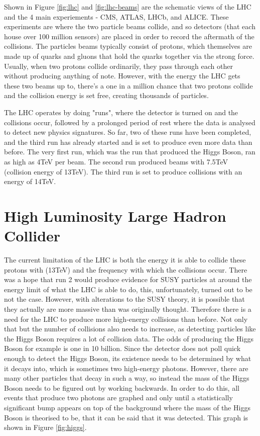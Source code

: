 \documentclass[a4paper]{article}
\theoremstyle{plain}
\theoremstyle{definition}
\begin{document}
	Shown in Figure \ref{fig:lhc} and \ref{fig:lhc-beams} are the schematic views of the LHC and the 4 main experiements - CMS, ATLAS, LHCb, and ALICE. These experiments are where the two particle beams collide, and so detectors (that each house over 100 million sensors) are placed in order to record the aftermath of the collisions. The particles beams typically consist of protons, which themselves are made up of quarks and gluons that hold the quarks together via the strong force. Usually, when two protons collide ordinarily, they pass through each other without producing anything of note. However, with the energy the LHC gets these two beams up to, there's a one in a million chance that two protons collide and the collision energy is set free, creating thousands of particles. 

	The LHC operates by doing "runs", where the detector is turned on and the collisions occur, followed by a prolonged period of rest where the data is analysed to detect new physics signatures. So far, two of these runs have been completed, and the third run has already started and is set to produce even more data than before. The very first run, which was the run that produced the Higgs Boson, ran as high as 4TeV per beam. The second run produced beams with 7.5TeV (collision energy of 13TeV). The third run is set to produce collisions with an energy of 14TeV.
	
	\section{High Luminosity Large Hadron Collider}
	\label{sec:hl-lhc}
	
	The current limitation of the LHC is both the energy it is able to collide these protons with (13TeV) and the frequency with which the collisions occur. There was a hope that run 2 would produce evidence for SUSY particles at around the energy limit of what the LHC is able to do, this, unfortunately, turned out to be not the case. However, with alterations to the SUSY theory, it is possible that they actually are more massive than was originally thought. Therefore there is a need for the LHC to produce more high-energy collisions than before. Not only that but the number of collisions also needs to increase, as detecting particles like the Higgs Boson requires a lot of collision data. The odds of producing the Higgs Boson for example is one in 10 billion. Since the detector does not poll quick enough to detect the Higgs Boson, its existence needs to be determined by what it decays into, which is sometimes two high-energy photons. However, there are many other particles that decay in such a way, so instead the mass of the Higgs Boson needs to be figured out by working backwards. In order to do this, all events that produce two photons are graphed and only until a statistically significant bump appears on top of the background where the mass of the Higgs Boson is theorised to be, that it can be said that it was detected. This graph is shown in Figure \ref{fig:higgs}.
	
\end{document}
